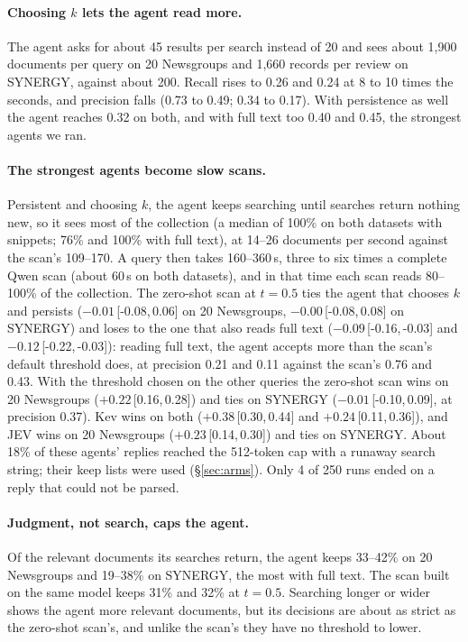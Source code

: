 \documentclass[11pt]{article}
\newcommand{\ci}[2]{\,[#1,\,#2]}
\begin{document}
\paragraph{Choosing $k$ lets the agent read more.}
The agent asks for about 45 results per search instead of 20 and sees about
1,900 documents per query on 20 Newsgroups and 1,660 records per review on
SYNERGY, against about 200. Recall rises to 0.26 and 0.24 at 8 to 10 times the
seconds, and precision falls (0.73 to 0.49; 0.34 to 0.17). With persistence as
well the agent reaches 0.32 on both, and with full text too 0.40 and 0.45, the
strongest agents we ran.

\paragraph{The strongest agents become slow scans.}
Persistent and choosing $k$, the agent keeps searching until searches return
nothing new, so it sees most of the collection (a median of 100\% on both
datasets with snippets; 76\% and 100\% with full text), at 14--26 documents per second
against the scan's 109--170. A query then takes 160--360\,s, three to six times
a complete Qwen scan (about 60\,s on both datasets), and in that time each
scan reads 80--100\% of the collection. The zero-shot scan at $t=0.5$ ties the
agent that chooses $k$ and persists ($-0.01$\ci{-0.08}{0.06} on 20 Newsgroups,
$-0.00$\ci{-0.08}{0.08} on SYNERGY) and loses to the one that also reads full
text ($-0.09$\ci{-0.16}{-0.03} and $-0.12$\ci{-0.22}{-0.03}): reading full
text, the agent accepts more than the scan's default threshold does, at precision
0.21 and 0.11 against the scan's 0.76 and 0.43. With the threshold chosen on the
other queries the zero-shot scan wins on 20 Newsgroups ($+0.22$\ci{0.16}{0.28})
and ties on SYNERGY ($-0.01$\ci{-0.10}{0.09}, at precision 0.37). Kev wins on
both ($+0.38$\ci{0.30}{0.44} and $+0.24$\ci{0.11}{0.36}), and JEV wins on 20
Newsgroups ($+0.23$\ci{0.14}{0.30}) and ties on SYNERGY. About 18\% of these
agents' replies reached the 512-token cap with a runaway search string; their
keep lists were used (\S\ref{sec:arms}). Only 4 of 250 runs ended on a reply
that could not be parsed.

\paragraph{Judgment, not search, caps the agent.}
Of the relevant documents its searches return, the agent keeps 33--42\% on 20
Newsgroups and 19--38\% on SYNERGY, the most with full text. The scan built on
the same model keeps 31\% and 32\% at $t=0.5$. Searching longer or wider shows
the agent more relevant documents, but its decisions are about as strict as the
zero-shot scan's, and unlike the scan's they have no threshold to lower.
\end{document}
